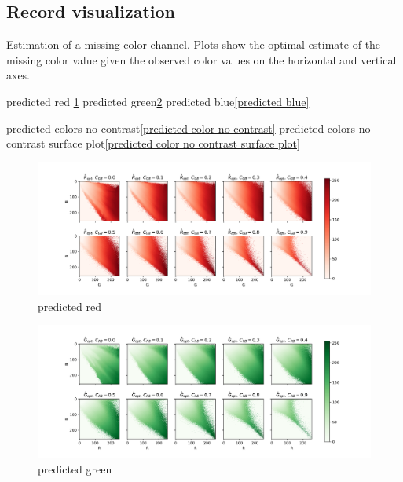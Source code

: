 \documentclass[11pt]{scrartcl} %
\begin{document}

\subsection{Record visualization}

Estimation of a missing color channel. Plots show the optimal estimate of the missing color value given the observed color values on the horizontal and vertical axes.

predicted red \ref{predicted red} 
predicted green\ref{predicted green}
predicted blue\ref{predicted blue}

predicted colors no contrast\ref{predicted color no contrast}
predicted colors no contrast surface plot\ref{predicted color no contrast surface plot}

\begin{figure}[h] %
	\centering
	\includegraphics[width=1\columnwidth]{Figure/predicted_red} %
	\caption{predicted red}
	\label{predicted red}
\end{figure}

\begin{figure}[h] %
	\centering
	\includegraphics[width=1\columnwidth]{Figure/predicted_green} %
	\caption{predicted green}
	\label{predicted green}
\end{figure}
\end{document}
